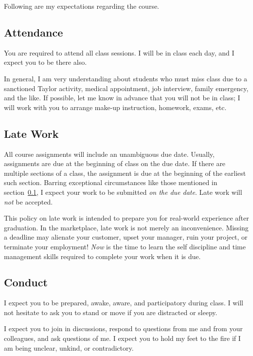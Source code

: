 Following are my expectations regarding the course.

\subsection{Attendance}
\label{sec:attendance}

You are required to attend all class sessions.
I will be in class each day, and I expect you to be there also.

In general, I am very understanding about students who must miss class
due to a sanctioned Taylor activity, medical appointment, job interview,
family emergency, and the like.
If possible, let me know in advance that you will not be in class;
I will work with you to arrange make-up instruction, homework, exams, etc.

\subsection{Late Work}

All course assignments will include an unambiguous due date.
Usually, assignments are due at the beginning of class on the due date.
If there are multiple sections of a class,
the assignment is due at the beginning of the earliest such section.
Barring exceptional circumstances like those mentioned in section~\ref{sec:attendance},
I expect your work to be submitted \emph{on the due date}.
Late work will \emph{not} be accepted.

This policy on late work is intended to prepare you
for real-world experience after graduation.
In the marketplace,
late work is not merely an inconvenience.
Missing a deadline may
alienate your customer,
upset your manager,
ruin your project,
or terminate your employment!
\emph{Now} is the time to learn the self discipline and time management skills
required to complete your work when it is due.

\subsection{Conduct}

I expect you to be prepared, awake, aware, and participatory during class. I will not
hesitate to ask you to stand or move if you are distracted or sleepy.

I expect you to join in discussions, respond to questions from me and from your
colleagues, and ask questions of me. I expect you to hold my feet to the fire if I am
being unclear, unkind, or contradictory.

